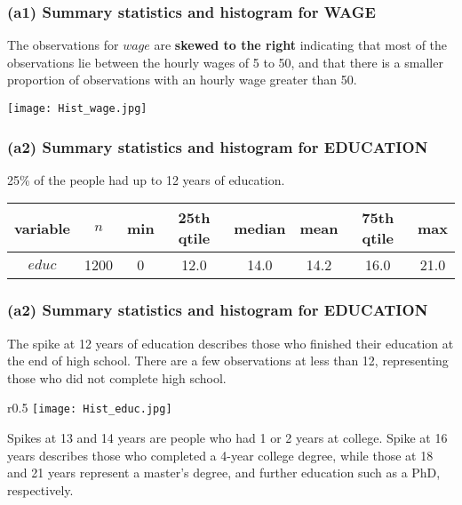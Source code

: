 \documentclass[11pt, xcolor=x11names,compress]{beamer}
\begin{document}
\begin{frame}[fragile,t]
\frametitle{(a1) Summary statistics and histogram for WAGE}
The observations for $wage$ are \textbf{skewed to the right} indicating that most of the observations lie between the hourly wages of 5 to 50, and that there is a smaller proportion of observations with an hourly wage greater than 50.

\begin{center}
    \texttt{[image: Hist\_wage.jpg]}
\end{center}
\end{frame}

\begin{frame}[fragile,t]
\frametitle{(a2) Summary statistics and histogram for 
EDUCATION}

\vspace{15mm}

25\% of the people had up to 12 years of education.  

\vspace{5mm}

\begin{center}
\setlength{\tabcolsep}{6pt}
\begin{tabular}{|c|c|c|c|c|c|c|c|}
\hline
variable &	$n$ & min & 25th qtile & median & mean  & 75th qtile &max \\
\hline
$educ$ & 1200 & 0 & 12.0 & 14.0 & 14.2 & 16.0 & 21.0\\
\hline
\end{tabular}
\end{center}
\hyperlink{Percentiles}{}
\end{frame}

\begin{frame}[fragile,t]
\frametitle{(a2) Summary statistics and histogram for 
EDUCATION}

The spike at 12 years of education describes those who finished their education at the end of high school. There are a few observations at less than 12, representing those who did not complete high school.\\

\begin{wrapfigure}{r}{0.5\textwidth}
\texttt{[image: Hist\_educ.jpg]}
\end{wrapfigure}

\vspace{5mm}

Spikes at 13 and 14 years are people who had 1 or 2 years at college. Spike at 16 years describes those who completed a 4-year college degree, while those at 18 and 21 years represent a master's degree, and further education such as a PhD, respectively. 

\end{frame}
\end{document}
